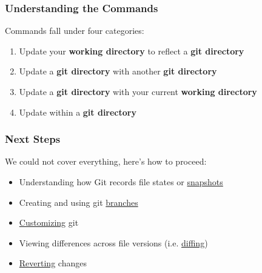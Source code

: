 \begin{frame}[t]\frametitle{Understanding the Commands}
		Commands fall under four categories:
		\begin{enumerate}
			\item Update your \textbf{working directory} to reflect
			a \textbf{git directory} 

			\vspace{0.3cm}
			
			\vspace{0.3cm}
			\item Update a \textbf{git directory} with another \textbf{git
			directory} 

			\vspace{0.3cm}
			
			\vspace{0.3cm}
			\item Update a \textbf{git directory} with your current
			\textbf{working directory} 

			\vspace{0.3cm}

			\vspace{0.3cm}
			\item Update within a \textbf{git directory} 

			\vspace{0.3cm}
		\end{enumerate}
\end{frame}

\begin{frame}[t]\frametitle{Next Steps}
	We could not cover everything, here's how to proceed:

	\begin{itemize}
		\item Understanding how Git records file states or
		\href{http://git-scm.com/book/en/Getting-Started-Git-Basics}{snapshots}
		\item Creating and using git 
		\href{http://git-scm.com/book/en/Git-Branching-What-a-Branch-Is}{branches}
		\item \href{http://git-scm.com/book/en/Getting-Started-First-Time-Git-Setup}{Customizing} git
		\item Viewing differences across file versions 
		(i.e. \href{http://git-scm.com/book/en/Git-Basics-Recording-Changes-to-the-Repository}{diffing})
		\item \href{http://git-scm.com/book/en/Git-Basics-Undoing-Things}{Reverting} changes
	\end{itemize}
\end{frame}

